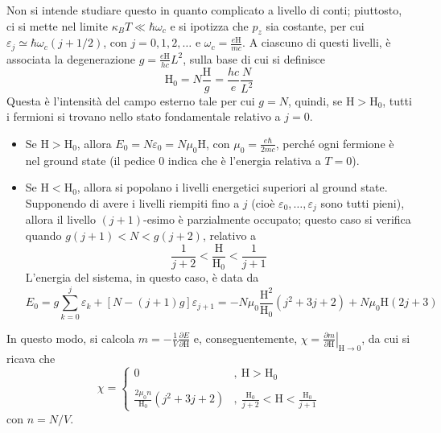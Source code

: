 \documentclass[11pt, a4paper]{scrartcl}
\theoremstyle{style}
\theoremstyle{style1}
\newcommand*\Eval[3]{\left.#1\right\rvert_{#2}^{#3}}
\numberwithin{equation}{subsection}
\begin{document}
Non si intende studiare questo in quanto complicato a livello di conti; piuttosto, ci si mette nel limite $\kappa _B T \ll \hbar \omega_c$ e si ipotizza che $p_z$ sia costante, per cui $\varepsilon _j \simeq \hbar \omega_c (j + 1 / 2)$, con $j=0,1,2,\ldots$ e $\omega_c = \frac{e\mathrm{H} }{mc}$.
A ciascuno di questi livelli, \`e associata la degenerazione $g = \frac{e\mathrm{H} }{h c}L^2$, sulla base di cui si definisce 
\[
\mathrm{H} _0 = N \frac{\mathrm{H} }{g} = \frac{hc}{e}\frac{N}{L^2 }
\] 
Questa \`e l'intensit\`a del campo esterno tale per cui $g = N$, quindi, se $\mathrm{H} > \mathrm{H} _0$, tutti i fermioni si trovano nello stato fondamentale relativo a $j=0$.
\begin{itemize}
	\item Se $\mathrm{H} > \mathrm{H} _0$, allora $E_0= N \varepsilon _0 = N \mu _0 \mathrm{H} $, con $\mu _0 = \frac{e \hbar }{2 m c}$, perch\'e ogni fermione \`e nel ground state (il pedice $0$ indica che \`e l'energia relativa a $T=0$).
	\item Se $\mathrm{H} < \mathrm{H} _0$, allora si popolano i livelli energetici superiori al ground state.
		Supponendo di avere i livelli riempiti fino a $j$ (cio\`e $\varepsilon _0 ,\ldots, \varepsilon _j$ sono tutti pieni), allora il livello $(j+1)$-esimo \`e parzialmente occupato; questo caso si verifica quando $g(j+1)<N<g(j+2)$, relativo a 
		\[
		\frac{1}{j+2} < \frac{\mathrm{H} }{\mathrm{H} _0}< \frac{1}{j+1}
		\] 
		L'energia del sistema, in questo caso, \`e data da 
		\[
		E_0 = g \sum_{k=0}^{j} \varepsilon _k + \left[ N - (j+1)g \right] \varepsilon _{j+1} = -N\mu _0 \frac{\mathrm{H} ^2}{\mathrm{H} _0} (j^2 + 3j + 2) + N\mu _0 \mathrm{H} (2j+3)
		\] 
\end{itemize}
In questo modo, si calcola $m = -\frac{1}{V} \frac{\partial E}{\partial \mathrm{H} } $ e, conseguentemente, $\chi  = \Eval{\frac{\partial m}{\partial \mathrm{H} } }{\mathrm{H} \to 0}{}$, da cui si ricava che
\[
\chi  = \begin{cases}
	0 &,\ \mathrm{H} > \mathrm{H} _0\\
	\\
	\displaystyle \frac{2\mu _0 n}{\mathrm{H} _0}(j^2 + 3j + 2) &,\ \displaystyle \frac{\mathrm{H} _0}{j+2}<\mathrm{H} < \frac{\mathrm{H} _0}{j+1}
\end{cases}
\] 
con $n= N / V$.
\end{document}
